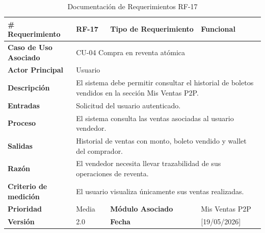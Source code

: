 \documentclass[12pt,letterpaper]{article}
\begin{document}
\begin{table}[H]
\centering
\scriptsize
\renewcommand{\arraystretch}{1.05}
\setlength{\tabcolsep}{3pt}

\newlength{\anchoceldaRFdiecisiete}
\setlength{\anchoceldaRFdiecisiete}{\dimexpr\textwidth-2.7cm-8\tabcolsep-5\arrayrulewidth\relax}

\begin{tabularx}{\textwidth}{|p{2.7cm}|X|p{2.8cm}|X|}
\hline
\textbf{\# Requerimiento} & RF-17 & \textbf{Tipo de Requerimiento} & Funcional \\ \hline

\textbf{Caso de Uso Asociado} & 
\multicolumn{3}{p{\anchoceldaRFdiecisiete}|}{CU-04 Compra en reventa atómica} \\ \hline

\textbf{Actor Principal} & 
\multicolumn{3}{p{\anchoceldaRFdiecisiete}|}{Usuario} \\ \hline

\textbf{Descripción} & 
\multicolumn{3}{p{\anchoceldaRFdiecisiete}|}{El sistema debe permitir consultar el historial de boletos vendidos en la sección Mis Ventas P2P.} \\ \hline

\textbf{Entradas} & 
\multicolumn{3}{p{\anchoceldaRFdiecisiete}|}{Solicitud del usuario autenticado.} \\ \hline

\textbf{Proceso} & 
\multicolumn{3}{p{\anchoceldaRFdiecisiete}|}{El sistema consulta las ventas asociadas al usuario vendedor.} \\ \hline

\textbf{Salidas} & 
\multicolumn{3}{p{\anchoceldaRFdiecisiete}|}{Historial de ventas con monto, boleto vendido y wallet del comprador.} \\ \hline

\textbf{Razón} & 
\multicolumn{3}{p{\anchoceldaRFdiecisiete}|}{El vendedor necesita llevar trazabilidad de sus operaciones de reventa.} \\ \hline

\textbf{Criterio de medición} & 
\multicolumn{3}{p{\anchoceldaRFdiecisiete}|}{El usuario visualiza únicamente sus ventas realizadas.} \\ \hline

\textbf{Prioridad} & Media & \textbf{Módulo Asociado} & Mis Ventas P2P \\ \hline

\textbf{Versión} & 2.0 & \textbf{Fecha} & [19/05/2026] \\ \hline

\end{tabularx}

\caption{Documentación de Requerimientos RF-17}
\label{tab:documentacion_requerimientos_rf17}
\normalsize
\end{table}
\end{document}
